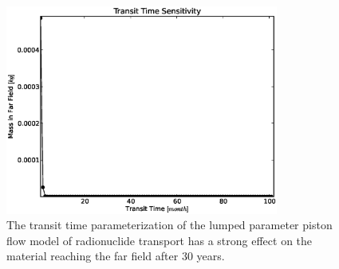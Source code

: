\begin{figure}[ht]
\centering
\includegraphics[width=0.8\textwidth]{./chapters/demonstration/base/lpPFM_t_t.eps}
\caption[Lumped Parameter Piston Flow Model Transit Time Sensitivity]{The transit time 
parameterization of the lumped parameter piston flow model of radionuclide 
transport has a strong effect on the material reaching the far field after 30 
years.  }
\label{fig:lp_t_t_end}
\end{figure}
\FloatBarrier

